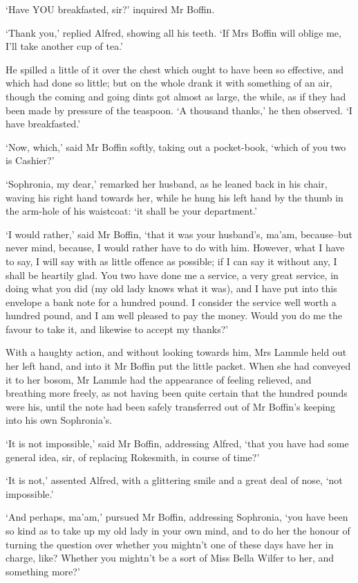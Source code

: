 ‘Have YOU breakfasted, sir?’ inquired Mr Boffin.

‘Thank you,’ replied Alfred, showing all his teeth. ‘If Mrs Boffin will
oblige me, I’ll take another cup of tea.’

He spilled a little of it over the chest which ought to have been so
effective, and which had done so little; but on the whole drank it with
something of an air, though the coming and going dints got almost as
large, the while, as if they had been made by pressure of the teaspoon.
‘A thousand thanks,’ he then observed. ‘I have breakfasted.’

‘Now, which,’ said Mr Boffin softly, taking out a pocket-book, ‘which of
you two is Cashier?’

‘Sophronia, my dear,’ remarked her husband, as he leaned back in his
chair, waving his right hand towards her, while he hung his left hand
by the thumb in the arm-hole of his waistcoat: ‘it shall be your
department.’

‘I would rather,’ said Mr Boffin, ‘that it was your husband’s, ma’am,
because--but never mind, because, I would rather have to do with him.
However, what I have to say, I will say with as little offence as
possible; if I can say it without any, I shall be heartily glad. You two
have done me a service, a very great service, in doing what you did (my
old lady knows what it was), and I have put into this envelope a bank
note for a hundred pound. I consider the service well worth a hundred
pound, and I am well pleased to pay the money. Would you do me the
favour to take it, and likewise to accept my thanks?’

With a haughty action, and without looking towards him, Mrs Lammle held
out her left hand, and into it Mr Boffin put the little packet. When she
had conveyed it to her bosom, Mr Lammle had the appearance of feeling
relieved, and breathing more freely, as not having been quite certain
that the hundred pounds were his, until the note had been safely
transferred out of Mr Boffin’s keeping into his own Sophronia’s.

‘It is not impossible,’ said Mr Boffin, addressing Alfred, ‘that you
have had some general idea, sir, of replacing Rokesmith, in course of
time?’

‘It is not,’ assented Alfred, with a glittering smile and a great deal
of nose, ‘not impossible.’

‘And perhaps, ma’am,’ pursued Mr Boffin, addressing Sophronia, ‘you have
been so kind as to take up my old lady in your own mind, and to do her
the honour of turning the question over whether you mightn’t one of
these days have her in charge, like? Whether you mightn’t be a sort of
Miss Bella Wilfer to her, and something more?’

